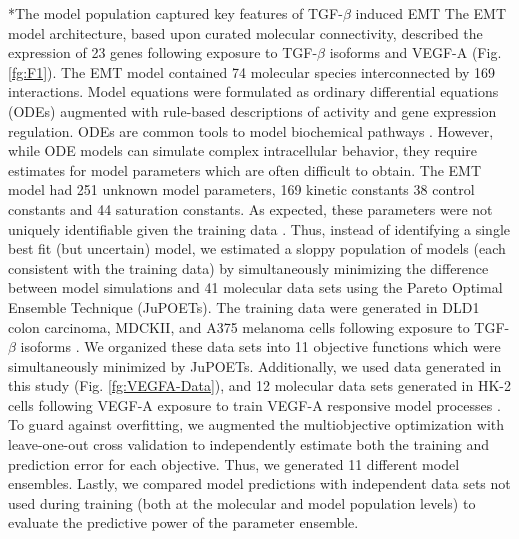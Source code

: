 \documentclass[12pt]{article}
\makeatletter
\renewcommand\subsection{\@startsection
	{subsection}{2}{0mm}
	{-0.05in}
	{-0.5\baselineskip}
	{\normalfont\normalsize\bfseries}}
\makeatother
\begin{document}
\subsection*{The model population captured key features of TGF-$\beta$ induced EMT}
The EMT model architecture, based upon curated molecular connectivity,
described the expression of 23 genes following exposure to TGF-$\beta$ isoforms and VEGF-A (Fig. \ref{fg:F1}).
The EMT model contained 74 molecular species interconnected by 169 interactions.
Model equations were formulated as ordinary differential equations (ODEs) augmented with rule-based descriptions of activity and gene expression regulation.
ODEs are common tools to model biochemical pathways \citep{Schoeberl:2002rv,Chen:2009uq,Tasseff:2011ve}.
However, while ODE models can simulate complex intracellular behavior,
they require estimates for model parameters which are often difficult to obtain.
The EMT model had 251 unknown model parameters, 169 kinetic constants 38 control constants and 44 saturation constants.
As expected, these parameters were not uniquely identifiable given the training data \citep{Gadkar:2005vn}.
Thus, instead of identifying a single best fit (but uncertain) model,
we estimated a sloppy population of models (each consistent with the training data) by simultaneously minimizing the difference between model simulations and 41 molecular
data sets using the Pareto Optimal Ensemble Technique (JuPOETs).
The training data were generated in DLD1 colon carcinoma, MDCKII, and A375 melanoma cells following
exposure to TGF-$\beta$ isoforms \citep{Medici:2008fk}. We organized these data sets into 11 objective functions which were simultaneously minimized by JuPOETs.
Additionally, we used data generated in this study (Fig. \ref{fg:VEGFA-Data}), and 12 molecular data sets generated in HK-2 cells following VEGF-A exposure to train VEGF-A responsive model processes \citep{Lian:2011bs}.
To guard against overfitting, we augmented the multiobjective optimization with leave-one-out cross validation to independently estimate both the training and
prediction error for each objective. Thus, we generated 11 different model ensembles.
Lastly, we compared model predictions with independent data sets not used during training (both at the molecular and model population
levels) to evaluate the predictive power of the parameter ensemble.
\end{document}
